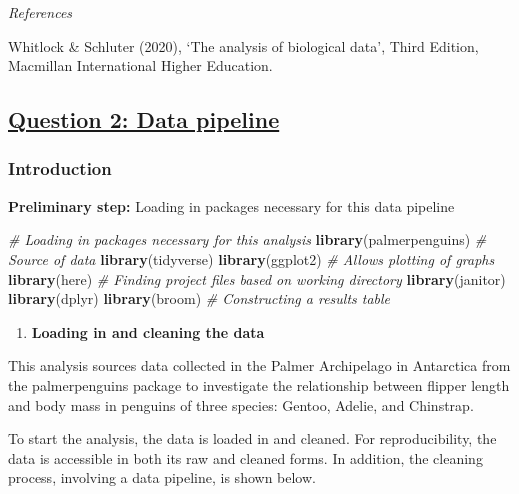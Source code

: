 \documentclass[
]{article}
\newenvironment{Shaded}{\begin{snugshade}}{\end{snugshade}}
\newcommand{\CommentTok}[1]{\textcolor[rgb]{0.56,0.35,0.01}{\textit{#1}}}
\newcommand{\FunctionTok}[1]{\textcolor[rgb]{0.13,0.29,0.53}{\textbf{#1}}}
\newcommand{\NormalTok}[1]{#1}
\providecommand{\tightlist}{%
  \setlength{\itemsep}{0pt}\setlength{\parskip}{0pt}}
\begin{document}
\emph{References}

Whitlock \& Schluter (2020), `The analysis of biological data', Third
Edition, Macmillan International Higher Education.

\subsection{\texorpdfstring{\ul{Question 2: Data
pipeline}}{Question 2: Data pipeline}}\label{question-2-data-pipeline}

\subsubsection{Introduction}\label{introduction}

\textbf{Preliminary step:} Loading in packages necessary for this data
pipeline

\begin{Shaded}
\begin{Highlighting}[]
\CommentTok{\# Loading in packages necessary for this analysis}
\FunctionTok{library}\NormalTok{(palmerpenguins) }\CommentTok{\# Source of data}
\FunctionTok{library}\NormalTok{(tidyverse)}
\FunctionTok{library}\NormalTok{(ggplot2) }\CommentTok{\# Allows plotting of graphs}
\FunctionTok{library}\NormalTok{(here) }\CommentTok{\# Finding project files based on working directory}
\FunctionTok{library}\NormalTok{(janitor)}
\FunctionTok{library}\NormalTok{(dplyr)}
\FunctionTok{library}\NormalTok{(broom) }\CommentTok{\# Constructing a results table}
\end{Highlighting}
\end{Shaded}

\begin{enumerate}
\def\labelenumi{\arabic{enumi}.}
\tightlist
\item
  \textbf{Loading in and cleaning the data}
\end{enumerate}

This analysis sources data collected in the Palmer Archipelago in
Antarctica from the palmerpenguins package to investigate the
relationship between flipper length and body mass in penguins of three
species: Gentoo, Adelie, and Chinstrap.

To start the analysis, the data is loaded in and cleaned. For
reproducibility, the data is accessible in both its raw and cleaned
forms. In addition, the cleaning process, involving a data pipeline, is
shown below.
\end{document}
